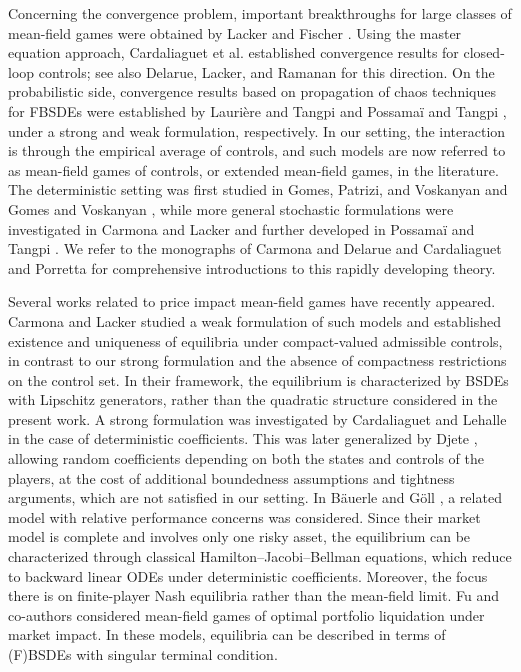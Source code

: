 \documentclass[10pt,a4paper]{article}
\theoremstyle{plain}
\theoremstyle{definition}
\numberwithin{equation}{section}
\begin{document}
Concerning the convergence problem, important breakthroughs for large classes of mean-field games were obtained by Lacker \cite{LackerAAP} and Fischer \cite{Fischer17}. Using the master equation approach, Cardaliaguet et al. \cite{cardaliaguet2019master} established convergence results for closed-loop controls; see also Delarue, Lacker, and Ramanan \cite{Del-Lac-Ram-19,Del-Lac-Ram_Concent} for this direction. On the probabilistic side, convergence results based on propagation of chaos techniques for FBSDEs were established by Lauri\`ere and Tangpi \cite{lauriere-tanpi22} and Possama\"i and Tangpi \cite{PossamaiTangpi2025}, under a strong and weak formulation, respectively. In our setting, the interaction is through the empirical average of controls, and such models are now referred to as mean-field games of controls, or extended mean-field games, in the literature. The deterministic setting was first studied in Gomes, Patrizi, and Voskanyan \cite{RefN7} and Gomes and Voskanyan \cite{RefN8}, while more general stochastic formulations were investigated in Carmona and Lacker \cite{RefN2} and further developed in Possama\"i and Tangpi \cite{PossamaiTangpi2025}. We refer to the monographs of Carmona and Delarue \cite{CarmonaDelarue2018Vol1,CarmonaDelarue2018Vol2} and Cardaliaguet and Porretta \cite{Ref7} for comprehensive introductions to this rapidly developing theory.
 
Several works related to price impact mean-field games have recently appeared. Carmona and Lacker \cite{RefN2} studied a weak formulation of such models and established existence and uniqueness of equilibria under compact-valued admissible controls, in contrast to our strong formulation and the absence of compactness restrictions on the control set. In their framework, the equilibrium is characterized by BSDEs with Lipschitz generators, rather than the quadratic structure considered in the present work. A strong formulation was investigated by Cardaliaguet and Lehalle \cite{RefN1} in the case of deterministic coefficients. This was later generalized by Djete \cite{RefN3}, allowing random coefficients depending on both the states and controls of the players, at the cost of additional boundedness assumptions and tightness arguments, which are not satisfied in our setting. In B\"auerle and G\"oll \cite{Ref1}, a related model with relative performance concerns was considered. Since their market model is complete and involves only one risky asset, the equilibrium can be characterized through classical Hamilton--Jacobi--Bellman equations, which reduce to backward linear ODEs under deterministic coefficients. Moreover, the focus there is on finite-player Nash equilibria rather than the mean-field limit. Fu and co-authors \cite{FGHP-2018,FHH1, FHH2} considered mean-field games of optimal portfolio liquidation under market impact. In these models, equilibria can be described in terms of (F)BSDEs with singular terminal condition.    
\end{document}
